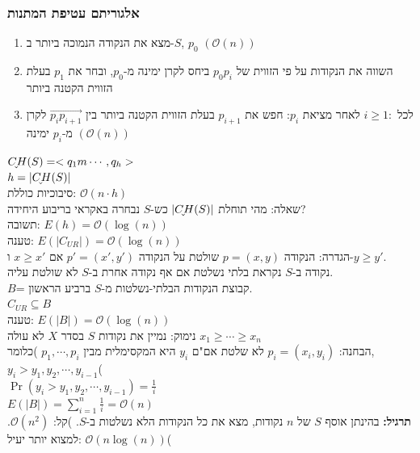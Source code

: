 \documentclass{article}
\makeatletter
\newcommand{\uhat}{\underaccent{\check}}
\newcommand*{\saved@uline}{}
\let\saved@uline\uline
\newcommand*{\mathuline}{%
  \mathpalette{\math@uline\saved@uline}%
}
\newcommand*{\math@uline}[3]{%
  \mbox{#1{$#2#3\m@th$}}%
}
\renewcommand*{\uline}{%
  \relax  
  \ifmmode
    \expandafter\mathuline
  \else
    \expandafter\saved@uline
  \fi
}
\makeatother
\begin{document}
\subsubsection{אלגוריתם עטיפת המתנות}
\begin{enumerate}
\item מצא את הנקודה הנמוכה ביותר ב-$S$, $p_0$ $(\mathcal{O}(n))$
\item השווה את הנקודות על פי הזווית של $p_0 p_i$ ביחס לקרן ימינה מ-$p_0$, ובחר את $p_1$ בעלת הזווית הקטנה ביותר
\item לכל $i \geq 1:$ לאחר מציאת $p_i$: חפש את $p_{i+1}$ בעלת הזווית הקטנה ביותר בין $\overrightarrow{p_i p_{i+1}}$ לקרן מ-$p_i$ ימינה $(\mathcal{O}(n))$
\end{enumerate}
$\uhat{CH}(S)= <q_1m \cdots, q_h>$\\
$h=|\uhat{CH}(S)|$\\
סיבוכיות כוללת: $\mathcal{O}(n \cdot h)$\\
\uline{שאלה:} מהי תוחלת $|\uhat{CH}(S)|$ כש-$S$ נבחרה באקראי בריבוע היחידה?\\
\uline{תשובה:} $E(h)= \mathcal{O}(\log(n))$\\
\uline{טענה:} $E(|C_{UR}|)= \mathcal{O}(\log(n))$\\
\uline{הגדרה:} הנקודה $p=(x,y)$ שולטת על הנקודה $p'=(x',y')$ אם $x \geq x'$ ו-$y \geq y'$.\\
נקודה ב-$S$ נקראת בלתי נשלטת אם אף נקודה אחרת ב-$S$ לא שולטת עליה.\\
$B$= קבוצת הנקודות הבלתי-נשלטות מ-$S$ ברביע הראשון.\\
$C_{UR} \subseteq B$\\
\uline{טענה:} $E(|B|)= \mathcal{O}(\log(n))$\\
\uline{נימוק:} נמיין את נקודות $S$ בסדר $X$ לא עולה $x_1 \geq \cdots \geq x_n$\\
\uline{הבחנה:}
$p_i=(x_i, y_i)$ לא שלטת אם"ם $y_i$ היא המקסימלית מבין $p_1, \cdots, p_i$ )כלומר, $y_i>y_1, y_2, \cdots, y_{i-1}$(\\
$\Pr(y_i>y_1, y_2, \cdots, y_{i-1})= \frac{1}{i}$\\
$E(|B|)= \sum_{i=1}^n \frac{1}{i}= \mathcal{O}(n)$\\
\textbf{תרגיל:} בהינתן אוסף $S$ של $n$ נקודות, מצא את כל הנקודות הלא נשלטות ב-$S$. )קל: $\mathcal{O}(n^2)$. למצוא יותר יעיל: $\mathcal{O}(n \log(n))$(\\
\end{document}
